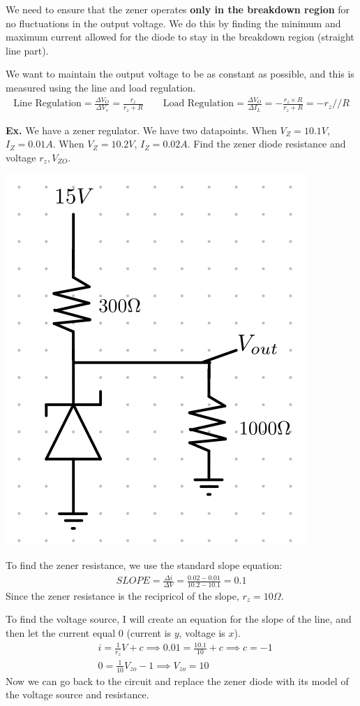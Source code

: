 \documentclass[12pt,letterpaper]{article} \usepackage{amsmath} \usepackage{graphicx} \usepackage[margin=1in]{geometry} \usepackage{longtable}  \usepackage{amssymb}
\begin{document}
	We need to ensure that the zener operates \textbf{only in the breakdown region} for no fluctuations in the output voltage. We do this by finding the minimum and maximum current allowed for the diode to stay in the breakdown region (straight line part).
	
	We want to maintain the output voltage to be as constant as possible, and this is measured using the line and load regulation. 
	\begin{align*}
		\text{Line Regulation}=\frac{\Delta V_O}{\Delta V_s} = \frac{r_z}{r_z+R} \qquad \text{Load Regulation}=\frac{\Delta V_O}{\Delta I_L} = -\frac{r_z\times R}{r_z+R} = -r_z // R
	\end{align*}

	\begin{mdframed}[]
		\textbf{Ex. }We have a zener regulator. We have two datapoints. When $V_Z=10.1V$, $I_Z = 0.01A$. When $V_Z=10.2V$, $I_Z=0.02A$. Find the zener diode resistance and voltage $r_z, V_{ZO}$. 
		\begin{center}
			\includegraphics[width=0.33\linewidth]{zener}
		\end{center}
		To find the zener resistance, we use the standard slope equation:
		\begin{align*}
			SLOPE = \frac{\Delta i}{\Delta V} = \frac{0.02-0.01}{10.2-10.1}=0.1
		\end{align*}
		Since the zener resistance is the recipricol of the slope, $r_z = 10\Omega$.
		
		To find the voltage source, I will create an equation for the slope of the line, and then let the current equal 0 (current is $y$, voltage is $x$). 
		\begin{align*}
			&i = \frac{1}{r_z}V+c \implies 0.01 = \frac{10.1}{10} + c \implies c  = -1\\
			&0 = \frac{1}{10}V_{zo}-1 \implies V_{zo}=10
		\end{align*}
		Now we can go back to the circuit and replace the zener diode with its model of the voltage source and resistance.
		

\end{mdframed}
\end{document}
